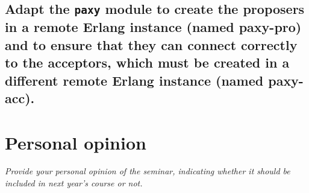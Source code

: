 \documentclass[a4paper, 10pt]{article}
\begin{document}
\subsection{Adapt the \texttt{paxy} module to create the proposers in a remote Erlang instance (named paxy-pro) and to ensure that they can connect correctly to the
acceptors, which must be created in a different remote Erlang instance (named
paxy-acc).}

\section{Personal opinion}

\textit{Provide your personal opinion of the seminar, indicating whether it should be included in next year's course or not.}
\end{document}
